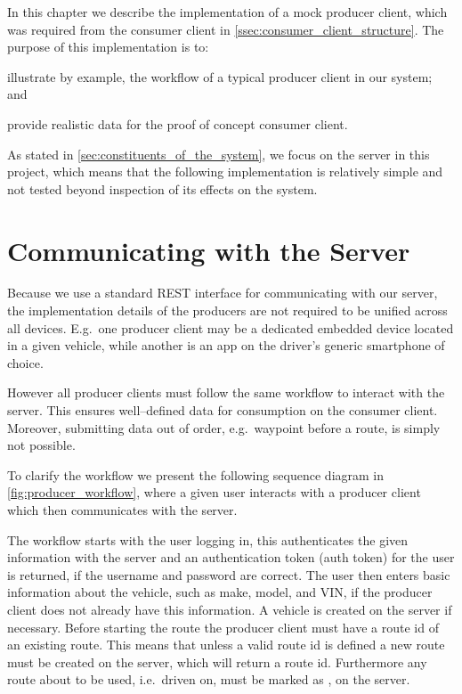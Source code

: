 In this chapter we describe the implementation of a mock producer client, which was required from the consumer client in \cref{ssec:consumer_client_structure}.
The purpose of this implementation is to:
\begin{enumberate*}
\item illustrate by example, the workflow of a typical producer client in our system; and
\item provide realistic data for the proof of concept consumer client.
\end{enumberate*}

As stated in \cref{sec:constituents_of_the_system}, we focus on the server in this project,
which means that the following implementation is relatively simple and not tested beyond inspection of its effects on the system.

\section{Communicating with the Server}
Because we use a standard REST interface for communicating with our server, the implementation details of the producers are not required to be unified across all devices.
E.g.~one producer client may be a dedicated embedded device located in a given vehicle, while another is an app on the driver's generic smartphone of choice.

However all producer clients must follow the same workflow to interact with the server.
This ensures well--defined data for consumption on the consumer client. %
Moreover, submitting data out of order, e.g.~waypoint before a route, is simply not possible.

\bigskip
To clarify the workflow we present the following sequence diagram in \cref{fig:producer_workflow},
where a given user interacts with a producer client which then communicates with the server.

The workflow starts with the user logging in, this authenticates the given information with the server and an authentication token (auth token) for the user is returned, if the username and password are correct.
The user then enters basic information about the vehicle, such as make, model, and VIN, if the producer client does not already have this information.
A vehicle is created on the server if necessary.
Before starting the route the producer client must have a route id of an existing route.
This means that unless a valid route id is defined a new route must be created on the server, which will return a route id.
Furthermore any route about to be used, i.e.~driven on, must be marked as , on the server.

